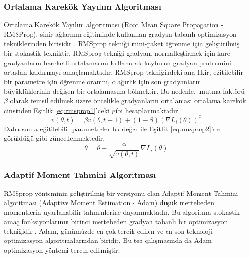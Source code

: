 \subsubsection{Ortalama Karekök Yayılım Algoritması}
Ortalama Karekök Yayılım algoritması (Root Mean Square Propagation - RMSProp), sinir ağlarının eğitiminde kullanılan gradyan tabanlı optimizasyon tekniklerinden birisidir \cite{tieleman2012lecture}. RMSprop tekniği mini-paket öğrenme için geliştirilmiş bir stokastik tekniktir. RMSprop tekniği gradyanı normalleştirmek için kare gradyanların hareketli ortalamasını kullanarak kaybolan gradyan problemini ortadan kaldırmayı amaçlamaktadır. RMSprop tekniğindeki ana fikir, eğitilebilir bir parametre için öğrenme oranını, o ağırlık için son gradyanların büyüklüklerinin değişen bir ortalamasına bölmektir. Bu nedenle, unutma faktörü $\beta$ olarak temsil edilmek üzere öncelikle gradyanların ortalaması ortalama karekök cinsinden Eşitlik \ref{eq:rmsprop1}'deki gibi hesaplanmaktadır.
\begin{equation}
	\label{eq:rmsprop1}
	v(\theta, t)=\beta v(\theta, t-1)+(1-\beta)\left(\nabla L_{i}(\theta)\right)^{2}
\end{equation}
Daha sonra eğitilebilir parametreler bu değer ile Eşitlik \ref{eq:rmsprop2}'de görüldüğü gibi güncellenmektedir.
\begin{equation}
	\label{eq:rmsprop2}
	\theta=\theta-\frac{\alpha}{\sqrt{v(\theta, t)}} \nabla L_{i}(\theta)
\end{equation}

\subsubsection{Adaptif Moment Tahmini Algoritması}
RMSprop yönteminin geliştirilmiş bir versiyonu olan Adaptif Moment Tahmini algoritması (Adaptive Moment Estimation - Adam) düşük mertebeden momentlerin uyarlanabilir tahminlerine dayanmaktadır. Bu algoritma stokastik amaç fonksiyonlarının birinci mertebeden gradyan tabanlı bir optimizasyon tekniğidir \cite{kingma2014adam}. Adam, günümüzde en çok tercih edilen ve en son teknoloji optimizasyon algoritmalarından biridir. Bu tez çalışmasında da Adam optimizasyon yöntemi tercih edilmiştir. 

